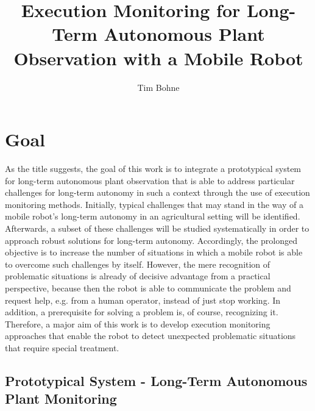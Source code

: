 \documentclass[english, master, expose, utf8]{base/thesis_KBS}
\begin{document}
\title{Execution Monitoring for Long-Term Autonomous Plant Observation with a Mobile Robot}
\author{Tim Bohne}

\generatetitle

\section{Goal}

As the title suggests, the goal of this work is to integrate a prototypical system for long-term autonomous plant observation that is able to address 
particular challenges for long-term autonomy in such a context through the use of execution monitoring methods. Initially, typical challenges that may stand in the way of a mobile
robot's long-term autonomy in an agricultural setting will be identified. Afterwards, a subset of these challenges will be studied systematically in order to 
approach robust solutions for long-term autonomy. Accordingly, the prolonged objective is to increase the number of situations in which a mobile robot is able to 
overcome such challenges by itself. However, the mere recognition of problematic situations is already of decisive advantage from a practical perspective, 
because then the robot is able to communicate the problem and request help, e.g. from a human operator, instead of just stop working. In addition, 
a prerequisite for solving a problem is, of course, recognizing it. Therefore, a major aim of this work is to develop execution monitoring approaches 
that enable the robot to detect unexpected problematic situations that require special treatment.

\subsection{Prototypical System - Long-Term Autonomous Plant Monitoring}
\label{sec:prototypical_system}
\end{document}
